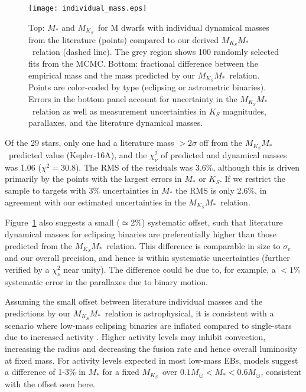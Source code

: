 \documentclass[twocolumn]{aastex62}
\newcommand{\mks}{$M_{K_S}$}
\newcommand{\mmk}{$M_{K_S}$\textendash$M_*$}
\begin{document}
\begin{figure}[th]
\begin{center}
\texttt{[image: individual\_mass.eps]}
\caption{Top: $M_*$ and \mks\ for M dwarfs with individual dynamical masses from the literature (points) compared to our derived \mmk\ relation (dashed line). The grey region shows 100 randomly selected fits from the MCMC. Bottom: fractional difference between the empirical mass and the mass predicted by our \mmk\ relation. Points are color-coded by type (eclipsing or astrometric binaries). Errors in the bottom panel account for uncertainty in the \mmk\ relation as well as measurement uncertainties in $K_S$ magnitudes, parallaxes, and the literature dynamical masses. }
\label{fig:ind}
\end{center}
\end{figure}

Of the 29 stars, only one had a literature mass $>2\sigma$ off from the \mmk\ predicted value (Kepler-16A), and the $\chi^2_\nu$ of predicted and dynamical masses was 1.06 ($\chi^2=30.8$). The RMS of the residuals was 3.6\%, although this is driven primarily by the points with the largest errors in $M_*$ or $K_S$. If we restrict the sample to targets with 3\% uncertainties in $M_*$ the RMS is only 2.6\%, in agreement with our estimated uncertainties in the \mmk\ relation. 

Figure~\ref{fig:ind} also suggests a small ($\simeq$2\%) systematic offset, such that literature dynamical masses for eclipsing binaries are preferentially higher than those predicted from the \mmk\ relation. This difference is comparable in size to $\sigma_e$ and our overall precision, and hence is within systematic uncertainties (further verified by a $\chi^2_\nu$ near unity). The difference could be due to, for example, a $<1$\% systematic error in the parallaxes due to binary motion. 

Assuming the small offset between literature individual masses and the predictions by our \mmk\ relation is astrophysical, it is consistent with a scenario where low-mass eclipsing binaries are inflated compared to single-stars due to increased activity \citep[e.g.,][]{MacDonald2012, Feiden2013,Feiden2014a,Somers2017}. Higher activity levels may inhibit convection, increasing the radius and decreasing the fusion rate and hence overall luminosity at fixed mass. For activity levels expected in most low-mass EBs, \citet{Feiden:2016aa} models suggest a difference of 1-3\% in $M_*$ for a fixed \mks\ over $0.1M_\odot<M_*<0.6M_\odot$, consistent with the offset seen here. 
\end{document}
